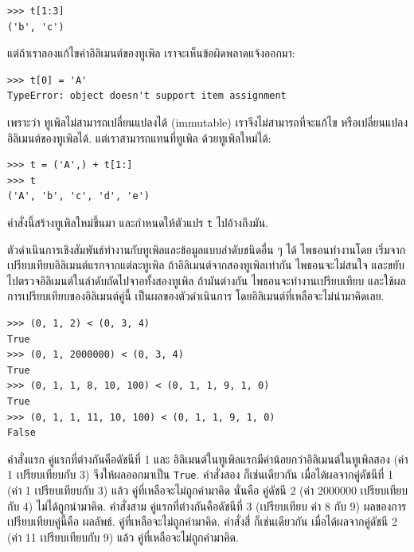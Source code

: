 \begin{verbatim}
>>> t[1:3]
('b', 'c')
\end{verbatim}
%
%
แต่ถ้าเราลองแก้ไขค่าอิลิเมนต์ของทูเพิล เราจะเห็นข้อผิดพลาดแจ้งออกมา:

\begin{verbatim}
>>> t[0] = 'A'
TypeError: object doesn't support item assignment
\end{verbatim}
%
%
เพราะว่า ทูเพิลไม่สามารถเปลี่ยนแปลงได้ (immutable)
เราจึงไม่สามารถที่จะแก้ไข หรือเปลี่ยนแปลงอิลิเมนต์ของทูเพิลได้.
แต่เราสามารถแทนที่ทูเพิล ด้วยทูเพิลใหม่ได้:

\begin{verbatim}
>>> t = ('A',) + t[1:]
>>> t
('A', 'b', 'c', 'd', 'e')
\end{verbatim}
%
คำสั่งนี้สร้างทูเพิลใหม่ขึ้นมา
และกำหนดให้ตัวแปร \texttt{t} ไปอ้างถึงมัน.


ตัวดำเนินการเชิงสัมพันธ์ทำงานกับทูเพิลและข้อมูลแบบลำดับชนิดอื่น ๆ ได้
ไพธอนทำงานโดย
เริ่มจากเปรียบเทียบอิลิเมนต์แรกจากแต่ละทูเพิล
ถ้าอิลิเมนต์จากสองทูเพิลเท่ากัน ไพธอนจะไม่สนใจ
และขยับไปตรวจอิลิเมนต์ในลำดับถัดไปจาอทั้งสองทูเพิล
ถ้ามันต่างกัน ไพธอนจะทำงานเปรียบเทียบ 
และใช้ผลการเปรียบเทียบของอิลิเมนต์คู่นี้ เป็นผลของตัวดำเนินการ
โดยอิลิเมนต์ที่เหลือจะไม่นำมาคิดเลย.
%

\begin{verbatim}
>>> (0, 1, 2) < (0, 3, 4)
True
>>> (0, 1, 2000000) < (0, 3, 4)
True
>>> (0, 1, 1, 8, 10, 100) < (0, 1, 1, 9, 1, 0)
True
>>> (0, 1, 1, 11, 10, 100) < (0, 1, 1, 9, 1, 0)
False
\end{verbatim}
%
คำสั่งแรก คู่แรกที่ต่างกันคือดัชนีที่ 1 และ
อิลิเมนต์ในทูเพิลแรกมีค่าน้อยกว่าอิลิเมนต์ในทูเพิลสอง (ค่า 1 เปรียบเทียบกับ 3) 
จึงให้ผลออกมาเป็น \texttt{True}.
คำสั่งสอง ก็เช่นเดียวกัน เมื่อได้ผลจากคู่ดัชนีที่ 1 (ค่า 1 เปรียบเทียบกับ 3) แล้ว
คู่ที่เหลือจะไม่ถูกคำมาคิด 
นั่นคือ คู่ดัชนี 2 (ค่า 2000000 เปรียบเทียบกับ 4) ไม่ได้ถูกนำมาคิด.
คำสั่งสาม คู่แรกที่ต่างกันคือดัชนีที่ 3 (เปรียบเทียบ ค่า 8 กับ 9)
ผลของการเปรียบเทียบคู่นี้คือ ผลลัพธ์.
คู่ที่เหลือจะไม่ถูกคำมาคิด.
คำสั่งสี่ ก็เช่นเดียวกัน เมื่อได้ผลจากคู่ดัชนี 2 (ค่า 11 เปรียบเทียบกับ 9) แล้ว
คู่ที่เหลือจะไม่ถูกคำมาคิด.

